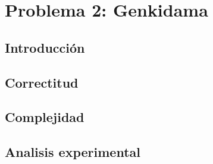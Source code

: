 \section{Problema 2:  Genkidama}
\subsection{Introducción}

\subsection{Correctitud}

\subsection{Complejidad}

\subsection{Analisis experimental}


